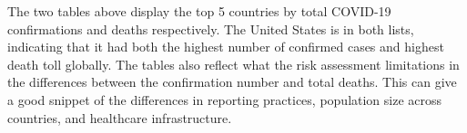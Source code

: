 \documentclass[
]{article}
\begin{document}
The two tables above display the top 5 countries by total COVID-19
confirmations and deaths respectively. The United States is in both
lists, indicating that it had both the highest number of confirmed cases
and highest death toll globally. The tables also reflect what the risk
assessment limitations in the differences between the confirmation
number and total deaths. This can give a good snippet of the differences
in reporting practices, population size across countries, and healthcare
infrastructure.
\end{document}
